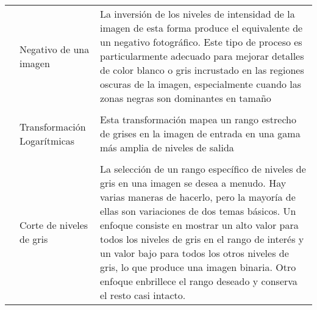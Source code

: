 \documentclass[letterpaper]{article}
\begin{document}
\begin{table}[H]

	\centering
    
	\begin{tabular}[10cm]{ 
    >{\centering\arraybackslash}m{3cm} 
    >{}m{5cm} 
    >{}m{5cm}}
    
    \toprule
    
        & Negativo de una imagen & La inversión de los niveles de intensidad de la imagen de esta forma produce el equivalente de un negativo fotográfico. Este tipo de proceso es particularmente adecuado para mejorar detalles de color blanco o gris incrustado en las regiones oscuras de la imagen, especialmente cuando las zonas negras son dominantes en tamaño \\ \\
        
        & Transformación Logarítmicas & Esta transformación mapea un rango estrecho de grises en la imagen de entrada en una gama más amplia de niveles de salida \\ \\
        
        & Corte de niveles de gris & La selección de un rango específico de niveles de gris en una imagen se desea a menudo. Hay varias maneras de hacerlo, pero la mayoría de ellas son variaciones de dos temas básicos. Un enfoque consiste en mostrar un alto valor para todos los niveles de gris en el rango de interés y un valor bajo para todos los otros niveles de gris, lo que produce una imagen binaria. Otro enfoque enbrillece el rango deseado y conserva el resto casi intacto. \\
        
        \bottomrule
        
	\end{tabular}
    
\end{table}
\end{document}
